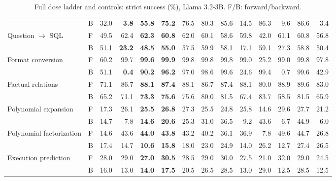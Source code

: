 \begin{table}[t]
\begin{tabular}{llrrrrrrrrrrrr}
 & B & 32.0 & \textcolor{red!70!black}{\textbf{3.8}} & \textcolor{blue!60!black}{\textbf{55.8}} & \textcolor{blue!60!black}{\textbf{75.2}} & 76.5 & 80.3 & 85.6 & 14.5 & 86.3 & 9.6 & 86.6 & 3.4 \\
\addlinespace[2pt]
Question $\to$ SQL & F & 49.5 & 62.4 & \textcolor{blue!60!black}{\textbf{62.3}} & \textcolor{blue!60!black}{\textbf{60.8}} & 62.0 & 60.1 & 58.6 & 59.8 & 42.0 & 61.1 & 60.8 & 56.8 \\
 & B & 51.1 & \textcolor{red!70!black}{\textbf{23.2}} & \textcolor{blue!60!black}{\textbf{48.5}} & \textcolor{blue!60!black}{\textbf{55.0}} & 57.5 & 59.9 & 58.1 & 17.1 & 59.1 & 27.3 & 58.8 & 50.4 \\
\addlinespace[2pt]
Format conversion & F & 60.2 & 99.7 & \textcolor{blue!60!black}{\textbf{99.6}} & \textcolor{blue!60!black}{\textbf{99.9}} & 99.8 & 99.8 & 99.8 & 99.0 & 25.2 & 99.0 & 99.8 & 97.8 \\
 & B & 51.1 & \textcolor{red!70!black}{\textbf{0.4}} & \textcolor{blue!60!black}{\textbf{90.2}} & \textcolor{blue!60!black}{\textbf{96.2}} & 97.0 & 98.6 & 99.6 & 24.6 & 99.4 & 0.7 & 99.6 & 42.9 \\
\addlinespace[2pt]
Factual relations & F & 71.1 & 86.7 & \textcolor{blue!60!black}{\textbf{88.1}} & \textcolor{blue!60!black}{\textbf{87.4}} & 88.1 & 86.7 & 87.4 & 88.1 & 80.0 & 88.9 & 89.6 & 83.0 \\
 & B & 65.2 & 71.1 & \textcolor{blue!60!black}{\textbf{73.3}} & \textcolor{blue!60!black}{\textbf{75.6}} & 75.6 & 80.0 & 81.5 & 67.4 & 83.7 & 58.5 & 81.5 & 65.9 \\
\addlinespace[2pt]
Polynomial expansion & F & 17.3 & 26.1 & \textcolor{blue!60!black}{\textbf{25.5}} & \textcolor{blue!60!black}{\textbf{26.8}} & 27.3 & 25.5 & 24.8 & 25.8 & 14.6 & 29.6 & 27.7 & 21.2 \\
 & B & 14.7 & 7.8 & \textcolor{blue!60!black}{\textbf{14.6}} & \textcolor{blue!60!black}{\textbf{20.6}} & 25.3 & 31.0 & 36.5 & 9.2 & 43.6 & 6.7 & 44.9 & 6.0 \\
\addlinespace[2pt]
Polynomial factorization & F & 14.6 & 43.6 & \textcolor{blue!60!black}{\textbf{44.0}} & \textcolor{blue!60!black}{\textbf{43.8}} & 43.2 & 40.2 & 36.1 & 36.9 & 7.8 & 49.6 & 44.7 & 26.8 \\
 & B & 17.4 & 14.7 & \textcolor{blue!60!black}{\textbf{10.6}} & \textcolor{blue!60!black}{\textbf{15.8}} & 18.0 & 23.0 & 24.9 & 14.0 & 26.2 & 12.7 & 27.4 & 26.5 \\
\addlinespace[2pt]
Execution prediction & F & 28.0 & 29.0 & \textcolor{blue!60!black}{\textbf{27.0}} & \textcolor{blue!60!black}{\textbf{30.5}} & 28.5 & 29.0 & 30.0 & 27.5 & 21.0 & 32.0 & 29.0 & 24.5 \\
 & B & 16.0 & 13.0 & \textcolor{blue!60!black}{\textbf{14.0}} & \textcolor{blue!60!black}{\textbf{17.5}} & 20.5 & 26.5 & 28.5 & 13.0 & 29.0 & 12.5 & 28.5 & 12.5 \\
\bottomrule
\end{tabular}
\caption{Full dose ladder and controls: strict success (\%), Llama 3.2-3B. F/B: forward/backward.}\label{tab:full-adaptations}
\end{table}
